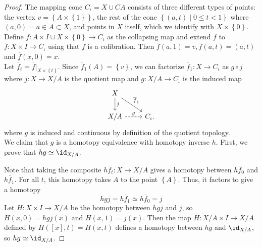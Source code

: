 \begin{proof}
    The mapping cone $C_{\iota} = X
    \cup CA$ consists of three different types of
    points: the vertex $v = \left\{ A \times \left\{ 1 \right\} 
    \right\} $, the rest of the cone
    $\left\{ \left( a,t \right)  \mid 0\le t < 1 \right\} $ 
    where $\left( a,0 \right) = a \in A \subset X$, and
    points in $X$ itself, which we identify with $X \times 
    \left\{ 0 \right\} $.\\
    Define $f \colon A \times I \cup  X \times \left\{ 0 \right\} 
    \to C_{\iota}$ as the collapsing map and extend
    $f$ to $\overline{f} \colon X \times I \to 
    C_{\iota}$ using that $f$ is a cofibration. 
    Then $\overline{f}\left( a,1 \right) =
    v, \overline{f}(a,t) = (a,t)$ and
    $\overline{f}(x,0) = x$.\\
    Let $\overline{f}_t = 
    \overline{f}|_{X \times \left\{ t \right\} }$.
    Since $\overline{f}_1 (A) = \left\{ v \right\} $, 
    we can factorize $\overline{f}_1 \colon
    X \to C_{\iota}$ as
    $g \circ j$ where
    $j \colon X \to X /A$ is the quotient map
    and $g \colon X / A \to C_{\iota}$ is
    the induced map
    \begin{equation*}
    \begin{tikzcd}
        X \ar[d, "j"] \ar[dr, "\overline{f}_1"] & \\
        X / A \ar[r, "g", dashed] & C_{\iota}.
    \end{tikzcd}
    \end{equation*}
    where $g$ is induced and continuous by
    definition of the quotient topology.\\
    We claim that $g$ is a homotopy equivalence with
    homotopy inverse $h$.
    First, we prove that $hg \simeq \id_{X / A}$.

    Note that taking the composite
    $h \overline{f}_t \colon X \to X / A$ gives a homotopy
    between $h \overline{f}_0$ and $h \overline{f}_1$.
    For all $t$, this homotopy takes
    $A$ to the point $\left\{ A \right\} $. Thus, it
    factors to give a homotopy
    \[
    hgj = h \overline{f}_1 
    \simeq h \overline{f}_0 = j
    \] 
    Let $H \colon X \times I \to X / A$ be the homotopy
    between $hgj$ and $j$, so
    $H(x, 0) = hgj(x)$ and
    $H(x,1) = j(x)$. Then
    the map
    $\overline{H} \colon X / A \times I \to X / A$ defined
    by
    $\overline{H}(\left[ x \right] ,t) = 
    H\left( x,t \right) $ defines a homotopy
    between $hg$ and $\id_{X / A}$, so
    $hg \simeq \id_{X / A}$.


\end{proof}
